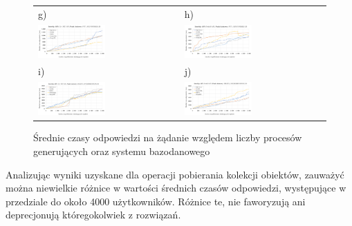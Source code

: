 \begin{figure}[htb]
\begin{tabular}{@{}ll@{}}
    g) & h) \\
    \includegraphics[width=0.49\textwidth]{rys05/response-dotnet-updateCourse.pdf} & \includegraphics[width=0.49\textwidth]{rys05/response-nodejs-updateCourse.pdf} \\
    i) & j) \\
    \includegraphics[width=0.49\textwidth]{rys05/response-dotnet-deleteReservation.pdf} & \includegraphics[width=0.49\textwidth]{rys05/response-nodejs-deleteReservation.pdf} \\
	\end{tabular}
  \caption{Średnie czasy odpowiedzi na żądanie względem liczby procesów generujących oraz systemu bazodanowego}
  \label{fig:response-mtc-1}
\end{figure}

Analizując wyniki uzyskane dla operacji pobierania kolekcji obiektów, zauważyć można niewielkie różnice w wartości średnich czasów odpowiedzi, występujące w przedziale do około 4000 użytkowników. Różnice te, nie faworyzują ani deprecjonują któregokolwiek z rozwiązań.

